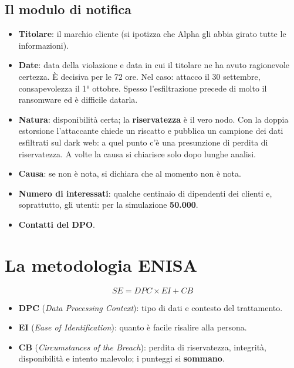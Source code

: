 \subsection{Il modulo di notifica}
\begin{itemize}
  \item \textbf{Titolare}: il marchio cliente (si ipotizza che Alpha gli abbia girato tutte le
    informazioni).
  \item \textbf{Date}: data della violazione e data in cui il titolare ne ha avuto ragionevole certezza.
    È decisiva per le 72 ore. Nel caso: attacco il 30 settembre, consapevolezza il 1° ottobre. Spesso
    l'esfiltrazione precede di molto il ransomware ed è difficile datarla.
  \item \textbf{Natura}: disponibilità certa; la \textbf{riservatezza} è il vero nodo. Con la doppia
    estorsione l'attaccante chiede un riscatto e pubblica un campione dei dati esfiltrati sul dark web:
    a quel punto c'è una presunzione di perdita di riservatezza. A volte la causa si chiarisce solo dopo
    lunghe analisi.
  \item \textbf{Causa}: se non è nota, si dichiara che al momento non è nota.
  \item \textbf{Numero di interessati}: qualche centinaio di dipendenti dei clienti e, soprattutto, gli
    utenti: per la simulazione \textbf{50.000}.
  \item \textbf{Contatti del DPO}.
\end{itemize}

\section{La metodologia ENISA}
\[
SE = DPC \times EI + CB
\]
\begin{itemize}
  \item \textbf{DPC} (\emph{Data Processing Context}): tipo di dati e contesto del trattamento.
  \item \textbf{EI} (\emph{Ease of Identification}): quanto è facile risalire alla persona.
  \item \textbf{CB} (\emph{Circumstances of the Breach}): perdita di riservatezza, integrità,
    disponibilità e intento malevolo; i punteggi si \textbf{sommano}.
\end{itemize}


